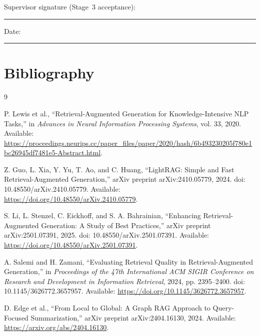\documentclass[12pt,a4paper]{article}
\begin{document}
\vspace{12mm}
\noindent
Supervisor signature (Stage~3 acceptance):
\rule{60mm}{0.4pt}
\hfill
Date: \rule{30mm}{0.4pt}


\section{Bibliography}
\label{sec:bibliography}

\begin{thebibliography}{9}

P. Lewis et al.,
``Retrieval-Augmented Generation for Knowledge-Intensive NLP Tasks,''
in \textit{Advances in Neural Information Processing Systems},
vol. 33, 2020.
Available:
\url{https://proceedings.neurips.cc/paper_files/paper/2020/hash/6b493230205f780e1bc26945df7481e5-Abstract.html}.

Z. Guo, L. Xia, Y. Yu, T. Ao, and C. Huang,
``LightRAG: Simple and Fast Retrieval-Augmented Generation,''
arXiv preprint arXiv:2410.05779, 2024.
doi: 10.48550/arXiv.2410.05779.
Available: \url{https://doi.org/10.48550/arXiv.2410.05779}.

S. Li, L. Stenzel, C. Eickhoff, and S. A. Bahrainian,
``Enhancing Retrieval-Augmented Generation: A Study of Best Practices,''
arXiv preprint arXiv:2501.07391, 2025.
doi: 10.48550/arXiv.2501.07391.
Available: \url{https://doi.org/10.48550/arXiv.2501.07391}.

A. Salemi and H. Zamani,
``Evaluating Retrieval Quality in Retrieval-Augmented Generation,''
in \textit{Proceedings of the 47th International ACM SIGIR Conference
on Research and Development in Information Retrieval},
2024, pp. 2395--2400.
doi: 10.1145/3626772.3657957.
Available: \url{https://doi.org/10.1145/3626772.3657957}.

D. Edge et al.,
``From Local to Global: A Graph RAG Approach to Query-Focused
Summarization,''
arXiv preprint arXiv:2404.16130, 2024.
Available: \url{https://arxiv.org/abs/2404.16130}.

\end{thebibliography}
\end{document}
